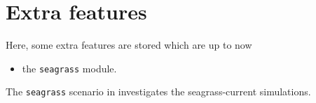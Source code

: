 %
%

\section{Extra features \label{sec:extra}}

Here, some extra features are stored which are up to now

\begin{itemize}
\item the {\tt seagrass} module.
\end{itemize}

The {\tt seagrass} scenario in  investigates the
\cite{VerduinBackhaus2000} seagrass-current simulations.
